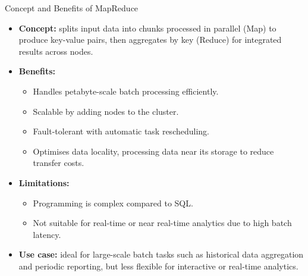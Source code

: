 \documentclass[aspectratio=169, table]{beamer}
\begin{document}
\begin{frame}{Concept and Benefits of MapReduce}
	\vspace{20pt}
	
	\begin{itemize}
		\item \textbf{Concept:} splits input data into chunks processed in parallel (Map) to produce key-value pairs, then aggregates by key (Reduce) for integrated results across nodes.
		
		\item \textbf{Benefits:}
		\begin{itemize}
			\item Handles petabyte-scale batch processing efficiently.
			\item Scalable by adding nodes to the cluster.
			\item Fault-tolerant with automatic task rescheduling.
			\item Optimises data locality, processing data near its storage to reduce transfer costs.
		\end{itemize}
		
		\item \textbf{Limitations:}
		\begin{itemize}
			\item Programming is complex compared to SQL.
			\item Not suitable for real-time or near real-time analytics due to high batch latency.
		\end{itemize}
		
		\item \textbf{Use case:} ideal for large-scale batch tasks such as historical data aggregation and periodic reporting, but less flexible for interactive or real-time analytics.
	\end{itemize}
	
\end{frame}
\end{document}
